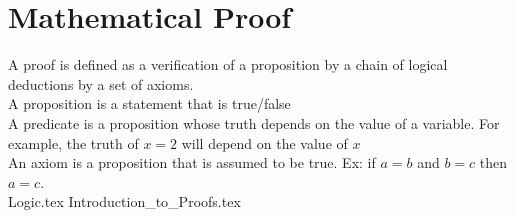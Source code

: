 \section{Mathematical Proof}
A proof is defined as a verification of a proposition by a chain of logical deductions by a set of axioms.\\
A proposition is a statement that is true/false\\
A predicate is a proposition whose truth depends on the value of a variable. For example, the truth of $x=2$ will depend on the value of $x$\\
An axiom is a proposition that is assumed to be true. Ex: if $a=b$ and $b=c$ then $a=c$.\\

{Logic.tex}
{Introduction_to_Proofs.tex}